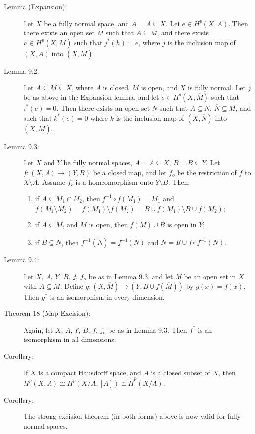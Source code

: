 \documentclass{article}
\begin{document}
\begin{description}

\item[Lemma (Expansion):] Let $X$ be a fully normal space, and $A = \overline{A} \subseteq X$. Let $e \in H^p(X,A)$. Then there exists an open set $M$ such that $A \subseteq M$, and there exists $h \in H^p(X,\overline{M})$ such that $j^*(h)=e$, where $j$ is the inclusion map of $(X,A)$ into $(X,\overline{M})$.

\item[Lemma 9.2:] Let $A \subseteq M \subseteq X$, where $A$ is closed, $M$ is open, and $X$ is fully normal. Let $j$ be as above in the Expansion lemma, and let $e \in H^p(X, \overline{M})$ such that $i^*(e)=0$. Then there exists an open set $N$ such that $A \subseteq N$, $\overline{N} \subseteq M$, and such that $k^*(e)=0$ where $k$ is the inclusion map of $(X, \overline{N})$ into $(X, \overline{M})$.

\item[Lemma 9.3:] Let $X$ and $Y$ be fully normal spaces, $A = \overline{A} \subseteq X$, $B = \overline{B} \subseteq Y$. Let $f: (X,A) \longrightarrow (Y,B)$ be a closed map, and let $f_o$ be the restriction of $f$ to $X \setminus A$. Assume $f_o$ is a homeomorphism onto $Y \setminus B$. Then:
  \begin{enumerate}[\hspace{1cm}(1)]
    \item if $A \subseteq M_1 \cap M_2$, then $f^{-1} \circ f(M_1) = M_1$ and $f(M_1 \setminus M_2) = f(M_1) \setminus f(M_2) = B \cup f(M_1) \setminus B \cup f(M_2)$;
    \item if $A \subseteq M$, and $M$ is open, then $f(M) \cup B$ is open in $Y$;
    \item if $B \subseteq N$, then $f^{-1}(\overline{N}) = \overline{ f^{-1}(N) }$ and $N = B \cup f \circ f^{-1}(N)$.
  \end{enumerate}

\item[Lemma 9.4:] Let $X$, $A$, $Y$, $B$, $f$, $f_o$ be as in Lemma 9.3, and let $M$ be an open set in $X$ with $A \subseteq M$. Define $g: (X, \overline{M}) \longrightarrow (Y, B \cup f(\overline{M}))$ by $g(x)=f(x)$. Then $g^*$ is an isomorphism in every dimension.

\item[Theorem 18 (Map Excision):] Again, let $X$, $A$, $Y$, $B$, $f$, $f_o$ be as in Lemma 9.3. Then $f^*$ is an isomorphism in all dimensions.

\item[Corollary:] If $X$ is a compact Hausdorff space, and $A$ is a closed subset of $X$, then $H^p(X,A) \cong H^p(X/A,[A]) \cong \widetilde{H}^p(X/A)$.

\item[Corollary:] The strong excision theorem (in both forms) above is now valid for fully normal spaces.

\end{description}
\end{document}
